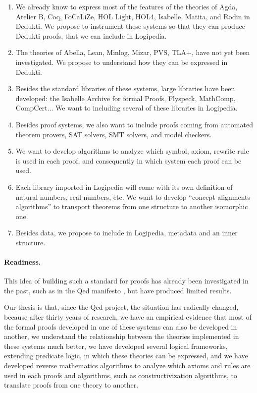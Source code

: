 \begin{enumerate}
\item 
  We already know to express most of the features of the theories of 
  {\sc Agda}, {\sc Atelier B}, {\sc Coq}, {\sc FoCaLiZe}, {\sc HOL Light},
  {\sc HOL4}, {\sc Isabelle}, {\sc Matita}, and {\sc Rodin}
  in {\sc Dedukti}. We propose to instrument these systems so that
  they can produce {\sc
 Dedukti} proofs, that we can include in
  {\sc Logipedia}. 

\item
  The theories of {\sc Abella}, {\sc Lean}, {\sc Minlog}, {\sc Mizar},
  {\sc PVS}, {\sc TLA+}, have not yet been investigated. We propose to
  understand how they can be expressed in 
  {\sc Dedukti}. 

\item
  Besides the standard libraries of these systems, large libraries
  have been developed: the 
  Isabelle Archive for formal Proofs, Flyspeck, MathComp, CompCert...
We want to including several of these libraries in {\sc Logipedia}. 
  
\item
  Besides proof systems, we also want to include proofs coming from
  automated theorem provers, SAT solvers, SMT solvers, and model checkers. 

\item
  We want to develop algorithms to analyze which symbol, axiom, rewrite
  rule is used in each proof, and consequently in which system each proof
  can be used.

\item
  Each library imported in {\sc Logipedia} will come with its own
  definition of natural numbers, real numbers, etc. We want to develop
  ``concept alignments algorithms'' to transport theorems from one
  structure to another isomorphic one.

\item 
  Besides data, we propose to include in {\sc Logipedia}, metadata and
  an inner structure.
\end{enumerate}



\paragraph{Readiness.}
This idea of building such a standard for proofs has already been
investigated in the past, such as in the Qed manifesto \cite{Qed94}, but
have produced limited results.

Our thesis is that, since the
Qed project, the situation has radically changed, because after
thirty years of research, we have an empirical evidence that most of
the formal proofs developed in one of these systems can also be
developed in another, we understand the relationship between the
theories implemented in these systems much better, we have developed
several logical frameworks, extending predicate logic, in which these
theories can be expressed, and we have developed reverse mathematics
algorithms to analyze which axioms and rules are used in each proofs
and algorithms, such as constructivization algorithms, to translate
proofs from one theory to another.
